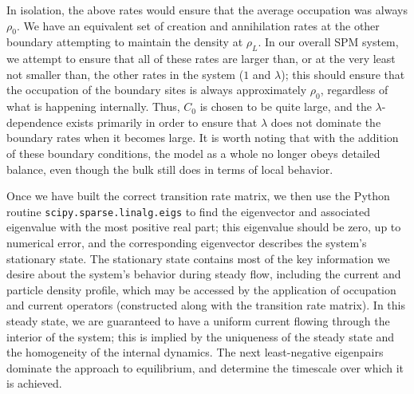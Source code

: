 \documentclass[
reprint, amsmath,amssymb, aps,
 prx,
]{revtex4-1}
\begin{document}
In isolation, the above rates would ensure that the average occupation was always $\rho_0$. We have an equivalent set of creation and annihilation rates at the other boundary attempting to maintain the density at $\rho_L$. In our overall SPM system, we attempt to ensure that all of these rates are larger than, or at the very least not smaller than,
the other rates in the system ($1$ and $\lambda$); this should ensure that the occupation of the boundary sites is always approximately $\rho_0$, regardless of what is happening internally.
Thus, $C_0$ is chosen to be quite large, and the $\lambda$-dependence exists primarily in order to ensure that $\lambda$ does not dominate the boundary rates when it becomes large.
It is worth noting that with the addition of these boundary conditions, the model as a whole no longer obeys detailed balance, even though the bulk still does in terms of
local behavior.

Once we have built the correct transition rate matrix, we then use the
Python routine \texttt{scipy.sparse.linalg.eigs} to find the
eigenvector and associated eigenvalue with the most positive real
part; this eigenvalue
should be zero, up to numerical error, and the corresponding
eigenvector describes the system's
stationary state.  The stationary state contains most of the key
information we desire about the system's behavior during steady flow,
including the current and particle density profile, which may be
accessed by the application of occupation and current operators
(constructed along with the transition rate matrix). In this steady
state, we are guaranteed to have a uniform current flowing through the
interior of the system; this is implied by the uniqueness of the
steady state and the homogeneity of the internal dynamics.  The next
least-negative eigenpairs dominate the approach to equilibrium, and
determine the timescale over which it is achieved.
\end{document}
